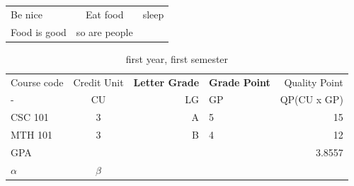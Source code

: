 \documentclass[landscape]{article}
\begin{document}
	\begin{table}
		\begin{tabular}{l| c | r}
			Be nice & Eat food & sleep\\
			Food is good & so are people
		\end{tabular}
	\end{table}

	\begin{table}
		\caption{first year, first semester}
		\label{tab: 1.1 }
		\begin{tabular}{l| c | r | l |r}
			Course code & Credit Unit & \textbf{Letter Grade} & 
			\textbf{Grade Point} & Quality Point\\
			-& CU & LG & GP & QP(CU x GP)\\
			\hline
			\cellcolor{red!25} CSC 101 & 3 & A & 5 & 15\\
			\cellcolor{green!20} MTH 101 & 3 & B & 4 & 12\\
			GPA & & & & 3.8557\\
			$\alpha$ & $\beta$\\
			
		\end{tabular}
	\end{table}


	
\end{document}
